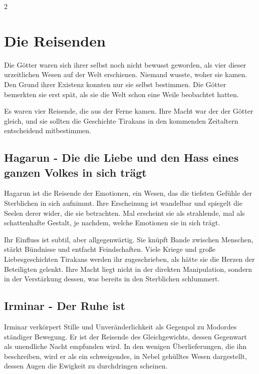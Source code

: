 \begin{multicols}{2}
{\section{Die Reisenden}\label{sec:die-reisenden}

Die Götter waren sich ihrer selbst noch nicht bewusst geworden, als vier dieser urzeitlichen Wesen auf der Welt erschienen.
Niemand wusste, woher sie kamen.
Den Grund ihrer Existenz konnten nur sie selbst bestimmen.
Die Götter bemerkten sie erst spät, als sie die Welt schon eine Weile beobachtet hatten.

Es waren vier Reisende, die aus der Ferne kamen.
Ihre Macht war der der Götter gleich, und sie sollten die Geschichte Tirakans in den kommenden Zeitaltern entscheidend mitbestimmen.

\subsection{Hagarun - Die die Liebe und den Hass eines ganzen Volkes in sich trägt}\label{subsec:hagarun-die-die-liebe-und-den-hass-eines-ganzen-volkes-in-sich-tragt}

Hagarun ist die Reisende der Emotionen, ein Wesen, das die tiefsten Gefühle der Sterblichen in sich aufnimmt.
Ihre Erscheinung ist wandelbar und spiegelt die Seelen derer wider, die sie betrachten.
Mal erscheint sie als strahlende, mal als schattenhafte Gestalt, je nachdem, welche Emotionen sie in sich trägt.

Ihr Einfluss ist subtil, aber allgegenwärtig.
Sie knüpft Bande zwischen Menschen, stärkt Bündnisse und entfacht Feindschaften.
Viele Kriege und große Liebesgeschichten Tirakans werden ihr zugeschrieben, als hätte sie die Herzen der Beteiligten gelenkt.
Ihre Macht liegt nicht in der direkten Manipulation, sondern in der Verstärkung dessen, was bereits in den Sterblichen schlummert.

\subsection{Irminar - Der Ruhe ist}\label{subsec:irminar-der-ruhe-ist}

Irminar verkörpert Stille und Unveränderlichkeit als Gegenpol zu Modordes ständiger Bewegung.
Er ist der Reisende des Gleichgewichts, dessen Gegenwart als unendliche Nacht empfunden wird.
In den wenigen Überlieferungen, die ihn beschreiben, wird er als ein schweigendes, in Nebel gehülltes Wesen dargestellt, dessen Augen die Ewigkeit zu durchdringen scheinen.

}
\end{multicols}
